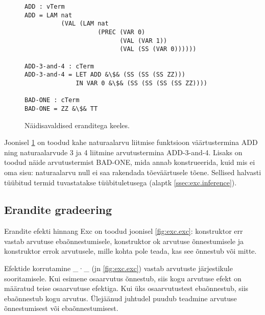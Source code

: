 \documentclass[a4paper,12pt]{article}
\begin{document}
\begin{figure}
  \begin{lstlisting}
ADD : vTerm
ADD = LAM nat
          (VAL (LAM nat
                    (PREC (VAR 0)
                          (VAL (VAR 1))
                          (VAL (SS (VAR 0))))))

ADD-3-and-4 : cTerm
ADD-3-and-4 = LET ADD &\$& (SS (SS (SS ZZ)))
              IN VAR 0 &\$& (SS (SS (SS (SS ZZ))))

BAD-ONE : cTerm
BAD-ONE = ZZ &\$& TT
  \end{lstlisting}
  \caption{Näidisavaldised eranditega keeles.}
  \label{fig:exc.raw.ex1}
\end{figure}

Joonisel \ref{fig:exc.raw.ex1} on toodud kahe naturaalarvu liitmise funktsioon väärtustermina ADD
ning naturaalarvude 3 ja 4 liitmine arvutustermina ADD-3-and-4.
Lisaks on toodud näide arvutustermist BAD-ONE, mida annab konstrueerida,
kuid mis ei oma sisu: naturaalarvu null ei saa rakendada tõeväärtusele tõene.
Sellised halvasti tüübitud termid tuvastatakse tüübituletusega (alaptk \ref{ssec:exc.inference}).

\subsection{Erandite gradeering} \label{ssec:exc.grading}

Erandite efekti hinnang Exc on toodud joonisel \ref{fig:exc.exc}: konstruktor err vastab arvutuse ebaõnnestumisele, konstruktor ok arvutuse õnnestumisele ja konstruktor errok arvutusele, mille kohta pole teada, kas see õnnestub või mitte.

Efektide korrutamine _·_ (jn \ref{fig:exc.exc}) vastab arvutuste järjestikule sooritamisele.
Kui esimene osaarvutus õnnestub, siis kogu arvutuse efekt on määratud teise osaarvutuse efektiga.
Kui üks osaarvutustest ebaõnnestub, siis ebaõnnestub kogu arvutus.
Ülejäänud juhtudel puudub teadmine arvutuse õnnestumisest või ebaõnnestumisest.
\end{document}
